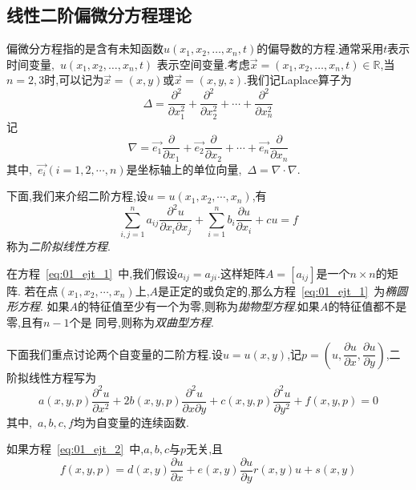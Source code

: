 \subsection{线性二阶偏微分方程理论}
偏微分方程指的是含有未知函数$u(x_1,x_2,\ldots,x_n,t)$的偏导数的方程.通常采用$t$表示时间变量,~$u(x_1,x_2,\ldots,x_n,t)$
表示空间变量.考虑$\vec{x}=(x_1,x_2,\ldots,x_n,t)\in \mathbb{R}$,当$n=2,3$时,可以记为$\vec{x}=(x,y)$或$\vec{x}=
(x,y,z)$.我们记Laplace算子为
\begin{equation*}
 \Delta = \dfrac{\partial^2}{\partial x_1^2}+\dfrac{\partial^2}{\partial x_2^2}+\cdots +  \dfrac{\partial^2}{\partial x_n^2}
\end{equation*}
记
\begin{equation*}
 \nabla = \vec{e_1}\dfrac{\partial}{\partial x_1}+\vec{e_2}\dfrac{\partial}{\partial x_2}
	  +\cdots + \vec{e_n}\dfrac{\partial}{\partial x_n}
\end{equation*}
其中,~$\vec{e_i}(i=1,2,\cdots,n)$是坐标轴上的单位向量,~$\Delta=\nabla\cdot\nabla$.\par
下面,我们来介绍二阶方程,设$u=u(x_1,x_2,\cdots,x_n)$,有
\begin{equation}\label{eq:01_ejt_1}
 \sum_{i,j=1}^{n}a_{ij}\dfrac{\partial^2 u}{\partial x_i \partial x_j}
 +\sum_{i=1}^{n} b_i\dfrac{\partial u}{\partial x_i} + cu=f
\end{equation}
称为\emph{二阶拟线性方程}.\par
在方程~\eqref{eq:01_ejt_1}~中,我们假设$a_{ij}=a_{ji}$.这样矩阵$A=[a_{ij}]$是一个$n\times n$的矩阵.
若在点$(x_1,x_2,\cdots,x_n)$上,$A$是正定的或负定的,那么方程~\eqref{eq:01_ejt_1}~为\emph{椭圆形方程}.
如果$A$的特征值至少有一个为零,则称为\emph{拋物型方程}.如果$A$的特征值都不是零,且有$n-1$个是
同号,则称为\emph{双曲型方程}.\par
下面我们重点讨论两个自变量的二阶方程.设$u=u(x,y)$,记$p=\left(u,\dfrac{\partial u}{\partial x},
\dfrac{\partial u}{\partial y}\right)$,二阶拟线性方程写为
\begin{equation}\label{eq:01_ejt_2}
 a(x,y,p)\dfrac{\partial^2 u}{\partial x^2}+2b(x,y,p)\dfrac{\partial^2 u}{\partial x\partial y}
 +c(x,y,p)\dfrac{\partial^2 u}{\partial y^2}+f(x,y,p)=0
\end{equation}
其中,~$a,b,c,f$均为自变量的连续函数.\par
如果方程~\eqref{eq:01_ejt_2}~中,$a,b,c$与$p$无关,且
\begin{equation}
 f(x,y,p)=d(x,y)\dfrac{\partial u}{\partial x}+e(x,y)\dfrac{\partial u}{\partial y}
	  r(x,y)u+s(x,y)
\end{equation}
